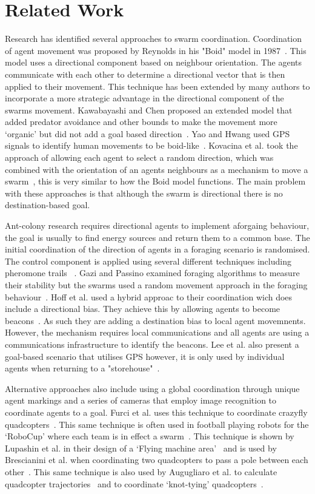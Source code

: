 \documentclass{ieeeaccess}
\begin{document}
\section{Related Work}\label{sec:RelatedWork}
Research has identified several approaches to swarm coordination. Coordination of agent movement was proposed by Reynolds in his "Boid" model in 1987~\cite{REY:87}. This model uses a directional component based on neighbour orientation. The agents communicate with each other to determine a directional vector that is then applied to their movement. This technique has been extended by many authors to incorporate a more strategic advantage in the directional component of the swarms movement. Kawabayashi and Chen proposed an extended model that added predator avoidance and other bounds to make the movement more `organic' but did not add a goal based direction~\cite{KC:08}. Yao and Hwang used GPS signals to identify human movements to be boid-like~\cite{YH:14}. Kovacina et al. took the approach of allowing each agent to select a random direction, which was combined with the orientation of an agents neighbours as a mechanism to move a swarm~\cite{MPYV:02}, this is very similar to how the Boid model functions. The main problem with these approaches is that although the swarm is directional there is no destination-based goal.

Ant-colony research requires directional agents to implement aforgaing behaviour, the goal is usually to find energy sources and return them to a common base. The initial coordination of the direction of agents in a foraging scenario is randomised. The control component is applied using several different techniques including pheromone trails~\cite{JRD:03,RGJHR:08,VBBLO:15,STZZW:13,SK:16} . Gazi and Passino examined foraging algorithms to measure their stability but the swarms used a random movement approach in the foraging behaviour~\cite{GP:04a}. Hoff et al. used a hybrid approac to their coordination wich does include a directional bias. They achieve this by allowing agents to become beacons~\cite{HSWN:10}. As such they are adding a destination bias to local agent movemnents. However, the mechanism requires local communications and all agents are using a communications infrastructure to identify the beacons. Lee et al. also present a goal-based scenario that utilises GPS however, it is only used by individual agents when returning to a "storehouse"~\cite{LAA:13}.

Alternative approaches also include using a global coordination through unique agent markings and a series of cameras that employ image recognition to coordinate agents to a goal. Furci et al. uses this technique to coordinate crazyfly quadcopters~\cite{FCNSM:15}. This same technique is often used in football playing robots for the `RoboCup' where each team is in effect a swarm~\cite{LL:09}. This technique is shown by Lupashin et al. in their design of a `Flying machine area'~\cite{LSHD:11} and is used by Brescianini et al. when coordinating two quadcopters to pass a pole between each other~\cite{BHD:13}. This same technique is also used by Augugliaro et al. to calculate quadcopter trajectories~\cite{ASD:12} and to coordinate `knot-tying' quadcopters~\cite{AZMD:15}.
\end{document}
